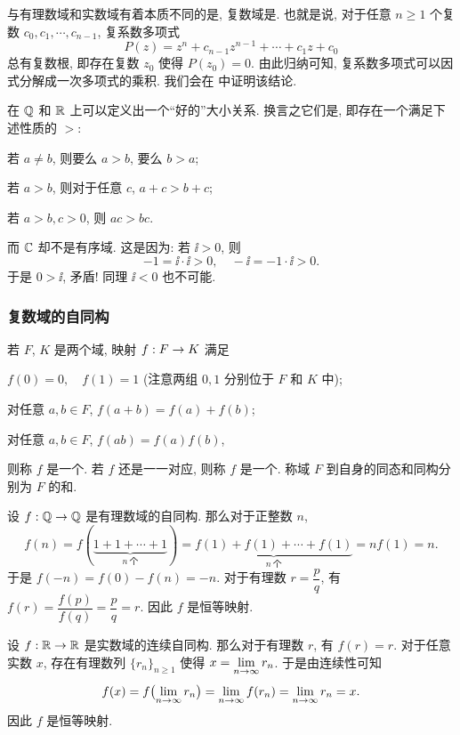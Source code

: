 与有理数域和实数域有着本质不同的是, 复数域是.
也就是说, 对于任意 $n\ge 1$ 个复数 $c_0,c_1,\cdots,c_{n-1}$, 复系数多项式
\[
  P(z)=z^n+c_{n-1}z^{n-1}+\cdots+c_1z+c_0
\]
总有复数根, 即存在复数 $z_0$ 使得 $P(z_0)=0$.
由此归纳可知, 复系数多项式可以因式分解成一次多项式的乘积.
我们会在 中证明该结论.

在 ${\mathbb{Q}}$ 和 ${\mathbb{R}}$ 上可以定义出一个``好的''大小关系.
换言之它们是, 即存在一个满足下述性质的 $>$:
\begin{enuma}
  \item 若 $a\neq b$, 则要么 $a>b$, 要么 $b>a$;
  \item 若 $a>b$, 则对于任意 $c$, $a+c>b+c$;
  \item 若 $a>b,c>0$, 则 $ac>bc$.
\end{enuma}\parnoindent
而 \alert{${\mathbb{C}}$ 却不是有序域}.
这是因为: 若 $\ii>0$, 则
\[
  -1=\ii\cdot \ii>0,\quad -\ii=-1\cdot \ii>0.
\]
于是 $0>\ii$, 矛盾! 同理 $\ii<0$ 也不可能.


\subsubsection{复数域的自同构}
\label{sssec:complex-field-isomorphism}

若 $F$, $K$ 是两个域, 映射 $f:F\rightarrow K$ 满足
\begin{enuma}
  \item $f(0)=0,\quad f(1)=1$ (注意两组 $0,1$ 分别位于 $F$ 和 $K$ 中);
  \item 对任意 $a,b\in F$, $f(a+b)=f(a)+f(b)$;
  \item 对任意 $a,b\in F$, $f(ab)=f(a)f(b)$,
\end{enuma}\parnoindent
则称 $f$ 是一个.
若 $f$ 还是一一对应, 则称 $f$ 是一个.
称域 $F$ 到自身的同态和同构分别为 $F$ 的和.

\begin{exampleenum}
  \item 设 $f:{\mathbb{Q}}\rightarrow{\mathbb{Q}}$ 是有理数域的自同构. 那么对于正整数 $n$,
  \[
      f(n)
    =f(\underbrace{1+1+\cdots+1}_{n\ \text{个}})
    =\underbrace{f(1)+f(1)+\cdots+f(1)}_{n\ \text{个}}
    =nf(1)=n.
  \]
  于是 $f(-n)=f(0)-f(n)=-n$.
  对于有理数 $r=\dfrac pq$, 有 $f(r)=\dfrac{f(p)}{f(q)}=\dfrac pq=r$.
  因此 $f$ 是恒等映射.
  \item 设 $f:{\mathbb{R}}\rightarrow{\mathbb{R}}$ 是实数域的连续自同构. 那么对于有理数 $r$, 有 $f(r)=r$.
  对于任意实数 $x$, 存在有理数列 $\{r_n\}_{n\ge 1}$ 使得 $x=\lim\limits_{n\rightarrow\infty} r_n$.
  于是由连续性可知
  \[
      f(x)
    =f\bigl(\lim_{n\rightarrow\infty} r_n\bigr)
    =\lim_{n\rightarrow\infty} f(r_n)
    =\lim_{n\rightarrow\infty} r_n
    =x.
  \]
  因此 $f$ 是恒等映射.
\end{exampleenum}

